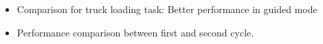 \documentclass[portrait,a0paper,fontscale=0.28]{baposter} %
\begin{document}
\begin{poster}
{	\begin{itemize}
	\item Comparison for truck loading task: Better performance in guided mode
	\end{itemize}
	\vspace{-1.5em}
	\centering
	\begin{minipage}{0.9\textwidth}
	  \label{comp}
	\end{minipage}
	
	\vspace{-1em}
	\begin{minipage}{.60\textwidth}
	  \begin{itemize}
	  \item Performance comparison between first and second cycle.
	    
	  \end{itemize}
	  
	\end{minipage}		
	\begin{minipage}{.35\textwidth}
	  
	\end{minipage}      
}



\end{poster}
\end{document}

